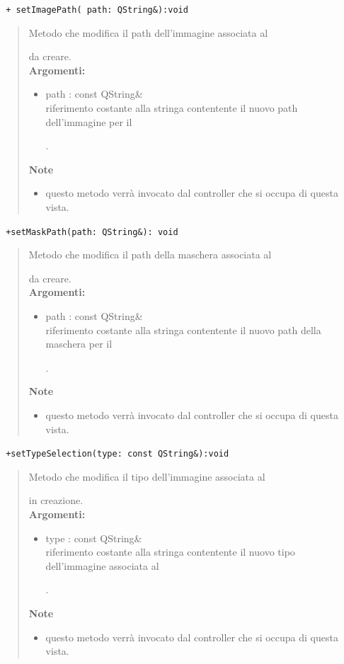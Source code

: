 \color{blue}\verb! + setImagePath( path: QString&):void !
\begin{quote}
\color{black} Metodo che modifica il path dell'immagine associata al \subject{} da creare. \\
  \textbf{Argomenti:}
 \begin{itemize}
\item path : const QString\& \\ riferimento costante alla stringa contentente il nuovo path dell'immagine per il \subject{}.
\end{itemize} 
 \textbf{Note}
 \begin{itemize}
 \item questo metodo verrà invocato dal controller che si occupa di questa vista.
 \end{itemize}
\end{quote}
\color{blue}\verb! +setMaskPath(path: QString&): void !
\begin{quote}
\color{black} Metodo che modifica il path della maschera associata al \subject{} da creare. \\
  \textbf{Argomenti:}
 \begin{itemize}
\item path : const QString\& \\ riferimento costante alla stringa contentente il nuovo path della maschera per il \subject{}.
\end{itemize}
 \textbf{Note}
 \begin{itemize}
 \item questo metodo verrà invocato dal controller che si occupa di questa vista.
 \end{itemize}
\end{quote}
\color{blue}\verb! +setTypeSelection(type: const QString&):void! 
\begin{quote}
\color{black} Metodo che modifica il tipo dell'immagine associata al \subject{} in creazione. \\
  \textbf{Argomenti:}
 \begin{itemize}
\item type : const QString\& \\ riferimento costante alla stringa contentente il nuovo tipo dell'immagine associata al  \subject{}.
\end{itemize}
 \textbf{Note}
 \begin{itemize}
 \item questo metodo verrà invocato dal controller che si occupa di questa vista.
 \end{itemize}
\end{quote}
